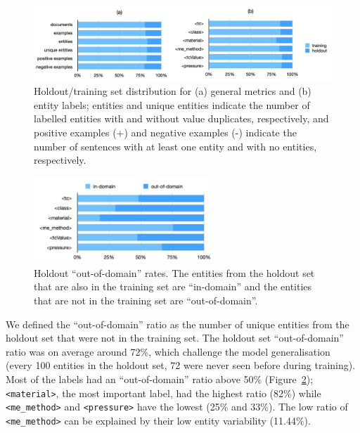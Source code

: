 \begin{figure}[ht]
    \centering
    \includegraphics[width=\textwidth]{figures/automatic_extraction_supercon/superconductor-holdout-training-set}
    \caption{Holdout/training set distribution for (a) general metrics and (b) entity labels; entities and unique entities indicate the number of labelled entities with and without value duplicates, respectively, and positive examples (+) and negative examples (-) indicate the number of sentences with at least one entity and with no entities, respectively.}
    \label{fig:training-holdout-set-distribution}
\end{figure}

\begin{figure}[ht]
    \centering
    \includegraphics[width=0.6\textwidth]{figures/automatic_extraction_supercon/superconductor-out-domain-holdout-unique}
    \caption{Holdout ``out-of-domain'' rates. The entities from the holdout set that are also in the training set are ``in-domain'' and the entities that are not in the training set are ``out-of-domain''.}
    \label{fig:out-domain-holdout}
\end{figure}

We defined the ``out-of-domain'' ratio as the number of unique entities from the holdout set that were not in the training set.
The holdout set ``out-of-domain'' ratio was on average around 72\%, which challenge the model generalisation (every 100 entities in the holdout set, 72 were never seen before during training).
Most of the labels had an ``out-of-domain'' ratio above 50\%  (Figure~\ref{fig:out-domain-holdout});  \texttt{<material>}, the most important label, had the highest ratio (82\%) while \texttt{<me\_method>} and \texttt{<pressure>} have the lowest (25\% and 33\%). 
The low ratio of \texttt{<me\_method>} can be explained by their low entity variability (11.44\%).


